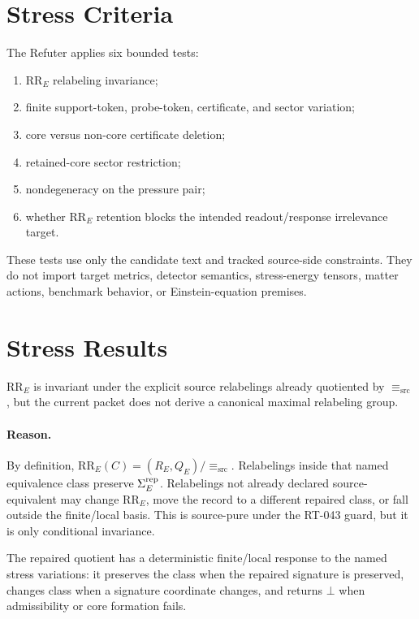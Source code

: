 \section{Stress Criteria}

The Refuter applies six bounded tests:
\begin{enumerate}
  \item \(\mathrm{RR}_E\) relabeling invariance;
  \item finite support-token, probe-token, certificate, and sector variation;
  \item core versus non-core certificate deletion;
  \item retained-core sector restriction;
  \item nondegeneracy on the pressure pair;
  \item whether \(\mathrm{RR}_E\) retention blocks the intended
    readout/response irrelevance target.
\end{enumerate}
These tests use only the candidate text and tracked source-side constraints.
They do not import target metrics, detector semantics, stress-energy tensors,
matter actions, benchmark behavior, or Einstein-equation premises.

\section{Stress Results}

\begin{proposition}
\(\mathrm{RR}_E\) is invariant under the explicit source relabelings already
quotiented by \(\equiv_{\mathrm{src}}\), but the current packet does not
derive a canonical maximal relabeling group.
\end{proposition}

\paragraph{Reason.}
By definition,
\(\mathrm{RR}_E(C)=(R_E,Q_E)/{\equiv_{\mathrm{src}}}\). Relabelings inside
that named equivalence class preserve \(\Sigma^{\mathrm{rep}}_E\). Relabelings not already
declared source-equivalent may change \(\mathrm{RR}_E\), move the record to a
different repaired class, or fall outside the finite/local basis. This is
source-pure under the RT-043 guard, but it is only conditional invariance.

\begin{proposition}
The repaired quotient has a deterministic finite/local response to the named
stress variations: it preserves the class when the repaired signature is
preserved, changes class when a signature coordinate changes, and returns
\(\bot\) when admissibility or core formation fails.
\end{proposition}

